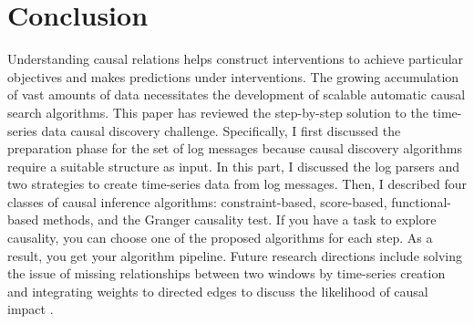 \section{Conclusion}
\label{sec:6}
Understanding causal relations helps construct interventions to achieve particular objectives and makes predictions under interventions. The growing accumulation of vast amounts of data necessitates the development of scalable automatic causal search algorithms. This paper has reviewed the step-by-step solution to the time-series data causal discovery challenge. Specifically, I first discussed the preparation phase for the set of log messages because causal discovery algorithms require a suitable structure as input. In this part, I discussed the log parsers and two strategies to create time-series data from log messages. Then, I described four classes of causal inference algorithms: constraint-based, score-based, functional-based methods, and the Granger causality test. If you have a task to explore causality, you can choose one of the proposed algorithms for each step. As a result, you get your algorithm pipeline. Future research directions include solving the issue of missing relationships between two windows by time-series creation and integrating weights to directed edges to discuss the likelihood of causal impact \cite{jarry2021quantitative}.